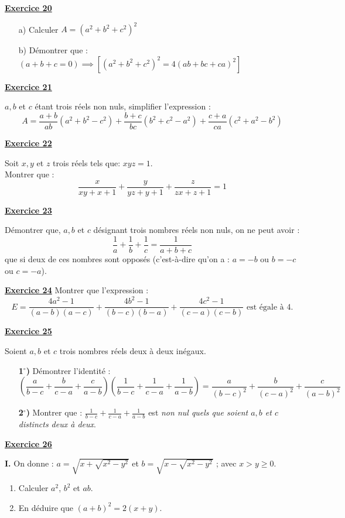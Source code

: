 \documentclass[12pt,a4paper]{article}
\newcommand{\exo}[1]{%
        \textbf{\underline{Exercice #1}}
}
\begin{document}
\exo{20}
\begin{enumerate}
    \item[a)] Calculer $A = (a^2+b^2+c^2)^2$
    \item[b)] Démontrer que : $(a+b+c=0) \implies [(a^2+b^2+c^2)^2 = 4(ab+bc+ca)^2]$
\end{enumerate}

\exo{21}

$a, b$ et $c$ étant trois réels non nuls, simplifier l’expression :
\[
A = \frac{a+b}{ab} (a^2 + b^2 - c^2) + \frac{b+c}{bc} (b^2 + c^2 - a^2) + \frac{c+a}{ca} (c^2 + a^2 - b^2)
\]

\exo{22}

Soit $x, y$ et $z$ trois réels tels que: $xyz = 1$. \\
Montrer que :
\[
\frac{x}{xy+x+1} + \frac{y}{yz+y+1} + \frac{z}{zx+z+1} = 1
\]

\exo{23}

Démontrer que, $a, b$ et $c$ désignant trois nombres réels non nuls, on ne peut avoir :
\[
\frac{1}{a} + \frac{1}{b} + \frac{1}{c} = \frac{1}{a+b+c}
\]
que si deux de ces nombres sont opposés (c'est-à-dire qu'on a : $a = -b$ ou $b = -c$ ou $c = -a$).

\exo{24} Montrer que l'expression :
\[
E = \frac{4a^2-1}{(a-b)(a-c)} + \frac{4b^2-1}{(b-c)(b-a)} + \frac{4c^2-1}{(c-a)(c-b)} \text{ est égale à } 4.
\]

\exo{25}
Soient $a, b$ et $c$ trois nombres réels deux à deux inégaux.
\begin{enumerate}
    \item[\textbf{1$^\circ$)}] Démontrer l'identité :
    \[
    \left(\frac{a}{b-c} + \frac{b}{c-a} + \frac{c}{a-b}\right) \left(\frac{1}{b-c} + \frac{1}{c-a} + \frac{1}{a-b}\right) = \frac{a}{(b-c)^2} + \frac{b}{(c-a)^2} + \frac{c}{(a-b)^2}
    \]
    \item[\textbf{2$^\circ$)}] Montrer que : $\frac{1}{b-c} + \frac{1}{c-a} + \frac{1}{a-b}$ est \textit{non nul quels que soient $a, b$ et $c$ distincts deux à deux}.
\end{enumerate}

\exo{26}

\textbf{I.} On donne : $a = \sqrt{x + \sqrt{x^2 - y^2}}$ et $b = \sqrt{x - \sqrt{x^2 - y^2}}$ ; avec $x > y \geq 0$.
\begin{enumerate}
    \item Calculer $a^2$, $b^2$ et $ab$. 
    \item En déduire que $(a+b)^2 = 2(x+y)$.
\end{enumerate}
\end{document}
